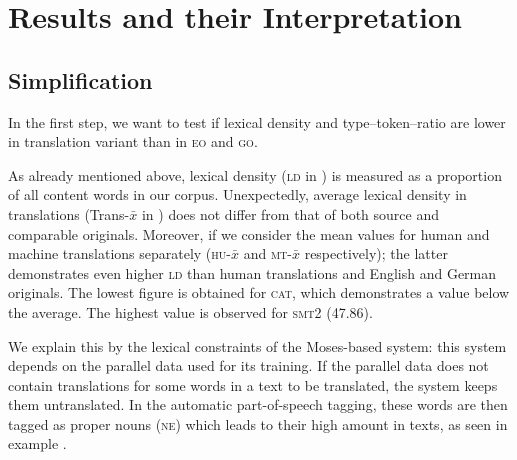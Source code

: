 \documentclass[output=paper]{LSP/langsci}
\begin{document}
\section{Results and their Interpretation} \label{sec:4:4} 
\subsection{Simplification}
In the first step, we want to test if lexical density and type--token--ratio are lower in translation variant than in \textsc{eo} and \textsc{go}.


\begin{table}
     \centering
 \caption{\textsc{sttr} and \textsc{ld} in \textsc{vartra}-\textsc{small}}
     \label{tab:4.2}
\end{table}


As already mentioned above, lexical density (\textsc{ld} in ) is measured as a proportion of all content words in our corpus. Unexpectedly, average lexical density in translations (Trans-$\bar{x}$ in ) does not differ from that of both source and comparable originals. Moreover, if we consider the mean values for human and machine translations separately (\textsc{hu}-$\bar{x}$ and \textsc{mt}-$\bar{x}$ respectively); the latter demonstrates even higher \textsc{ld} than human translations and English and German originals. The lowest figure is obtained for \textsc{cat}, which demonstrates a value below the average. The highest value is observed for \textsc{smt}2 (47.86).

We explain this by the lexical constraints of the Moses-based system: this system depends on the parallel data used for its training.  If the parallel data does not contain translations for some words in a text to be translated, the system keeps them untranslated. In the automatic part-of-speech tagging, these words are then tagged as proper nouns (\textsc{ne}) which leads to their high amount in texts, as seen in example .
\end{document}
